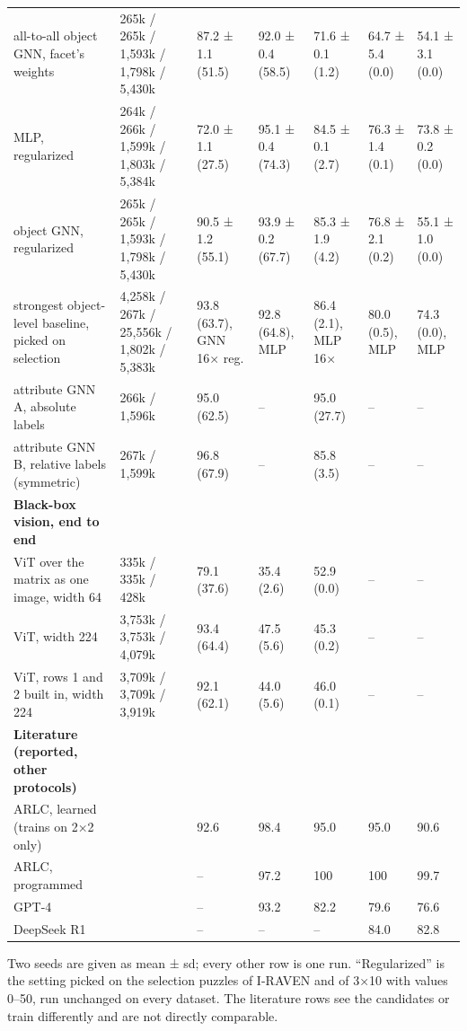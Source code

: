 {\begin{xltabular}{\linewidth}{@{}YYYlYll@{}}
all-to-all object GNN, facet's weights & 265k / 265k / 1,593k / 1,798k / 5,430k & 87.2 ± 1.1 (51.5) & 92.0 ± 0.4 (58.5) & 71.6 ± 0.1 (1.2) & 64.7 ± 5.4 (0.0) & 54.1 ± 3.1 (0.0) \\
MLP, regularized & 264k / 266k / 1,599k / 1,803k / 5,384k & 72.0 ± 1.1 (27.5) & 95.1 ± 0.4 (74.3) & 84.5 ± 0.1 (2.7) & 76.3 ± 1.4 (0.1) & 73.8 ± 0.2 (0.0) \\
object GNN, regularized & 265k / 265k / 1,593k / 1,798k / 5,430k & 90.5 ± 1.2 (55.1) & 93.9 ± 0.2 (67.7) & 85.3 ± 1.9 (4.2) & 76.8 ± 2.1 (0.2) & 55.1 ± 1.0 (0.0) \\
strongest object-level baseline, picked on selection & 4,258k / 267k / 25,556k / 1,802k / 5,383k & 93.8 (63.7), GNN 16× reg. & 92.8 (64.8), MLP & 86.4 (2.1), MLP 16× & 80.0 (0.5), MLP & 74.3 (0.0), MLP \\
attribute GNN A, absolute labels & 266k / 1,596k & 95.0 (62.5) & – & 95.0 (27.7) & – & – \\
attribute GNN B, relative labels (symmetric) & 267k / 1,599k & 96.8 (67.9) & – & 85.8 (3.5) & – & – \\
\textbf{Black-box vision, end to end} &  &  &  &  &  &  \\
ViT over the matrix as one image, width 64 & 335k / 335k / 428k & 79.1 (37.6) & 35.4 (2.6) & 52.9 (0.0) & – & – \\
ViT, width 224 & 3,753k / 3,753k / 4,079k & 93.4 (64.4) & 47.5 (5.6) & 45.3 (0.2) & – & – \\
ViT, rows 1 and 2 built in, width 224 & 3,709k / 3,709k / 3,919k & 92.1 (62.1) & 44.0 (5.6) & 46.0 (0.1) & – & – \\
\textbf{Literature (reported, other protocols)} &  &  &  &  &  &  \\
ARLC, learned (trains on 2×2 only) &  & 92.6 & 98.4 & 95.0 & 95.0 & 90.6 \\
ARLC, programmed &  & – & 97.2 & 100 & 100 & 99.7 \\
GPT-4 &  & – & 93.2 & 82.2 & 79.6 & 76.6 \\
DeepSeek R1 &  & – & – & – & 84.0 & 82.8 \\
\bottomrule
\end{xltabular}}

Two seeds are given as mean ± sd; every other row is one run. ``Regularized'' is the setting picked on the selection puzzles of I-RAVEN and of 3×10 with values 0–50, run unchanged on every dataset. The literature rows see the candidates or train differently and are not directly comparable.

